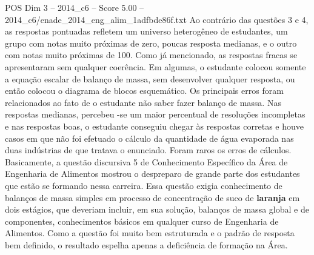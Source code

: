\begin{textsample}{POS Dim 3 – 2014\_c6 – Score 5.00 – 2014\_c6/enade\_2014\_eng\_alim\_1adfbde86f.txt}
Ao contrário das questões 3 e 4, as respostas pontuadas refletem um universo heterogêneo de estudantes, um grupo com notas muito próximas de zero, poucas resposta medianas, e o outro com notas muito próximas de 100.
Como já mencionado, as respostas fracas se apresentaram sem qualquer coerência.
Em algumas, o estudante colocou somente a equação escalar de balanço de massa, sem desenvolver qualquer resposta, ou então colocou o diagrama de blocos esquemático.
Os principais erros foram relacionados ao fato de o estudante não saber fazer balanço de massa.
Nas respostas medianas, percebeu -se um maior percentual de resoluções incompletas e nas respostas boas, o estudante conseguiu chegar às respostas corretas e houve casos em que não foi efetuado o cálculo da quantidade de água evaporada nas duas indústrias de que tratava o enunciado.
Foram raros os erros de cálculos.
Basicamente, a questão discursiva 5 de Conhecimento Específico da Área de Engenharia de Alimentos mostrou o despreparo de grande parte dos estudantes que estão se formando nessa carreira.
Essa questão exigia conhecimento de balanços de massa simples em processo de concentração de suco de \textbf{laranja} em dois estágios, que deveriam incluir, em sua solução, balanços de massa global e de componentes, conhecimentos básicos em qualquer curso de Engenharia de Alimentos.
Como a questão foi muito bem estruturada e o padrão de resposta bem definido, o resultado espelha apenas a deficiência de formação na Área.

\end{textsample}
